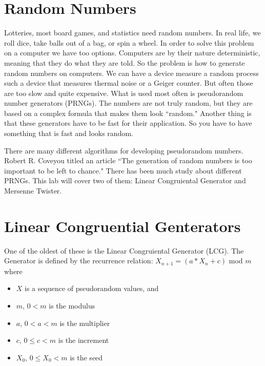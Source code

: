 \label{Ch:PRNG}


\section*{Random Numbers}

Lotteries, most board games, and statistics need random numbers.
In real life, we roll dice, take balls out of a bag, or spin a wheel.
In order to solve this problem on a computer we have too options.
Computers are by their nature deterministic, meaning that they do what they are told.
So the problem is how to generate random numbers on computers.
We can have a device measure a random process such a device that measures thermal noise or a Geiger counter.
But often those are too slow and quite expensive.
What is used most often is pseudorandom number generators (PRNGs).
The numbers are not truly random, but they are based on a complex formula that makes them look ``random."
Another thing is that these generators have to be fast for their application.
So you have to have something that is fast and looks random.

There are many different algorithms for developing pseudorandom numbers. Robert R. Coveyou titled an article ``The generation of random numbers is too important to be left to chance."
There has been much study about different PRNGs.
This lab will cover two of them: Linear Congruiental Generator and Mersenne Twister.

\section*{Linear Congruential Genterators}

One of the oldest of these is the Linear Congruiental Generator (LCG).
The Generator is defined by the recurrence relation:
$X_{n+1}=(a*X_n + c)$ mod $m$ where

\begin{itemize}
\item[] $X$ is a sequence of pseudorandom values, and
\item[] $m$, $0<m$ is the modulus
\item[] $a$, $0<a<m$ is the multiplier
\item[] $c$, $0\leq c<m$ is the increment
\item[] $X_0$, $0\leq X_0 <m$ is the seed
\end{itemize}

